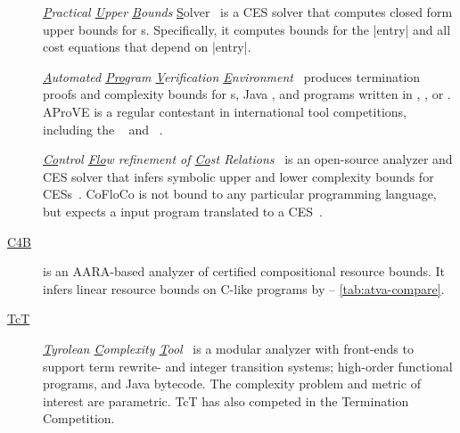 \begin{description}

\item[\href{https://costa.fdi.ucm.es/~costa/pubs/pubs.php}{}]
      \emph{\underline{P}ractical \underline{U}pper \underline{B}ounds}
      \underline{S}olver~\cite{albert2010}
      is a CES solver that computes closed form upper bounds for s. Specifically, it computes bounds for the \pr|entry| and
      all cost equations that depend on \pr|entry|.

\item[\href{https://aprove.informatik.rwth-aachen.de}{}]
      \emph{\underline{A}utomated \underline{Pro}gram \underline{V}erification
      \underline{E}nvironment}~\cite{giesl2016}
      produces termination proofs and complexity bounds for s, Java , and programs written in ,
      , or .
      AProVE is a regular contestant in international tool competitions,
      including the
      \href{https://termination-portal.org/wiki/Termination_Competition}%
      {}~\cite{giesl2019}
      and \href{https://sv-comp.sosy-lab.org}%
      {}~\cite{beyer2022}.

\item[\href{https://github.com/aeflores/CoFloCo}{}]
      \emph{\underline{Co}ntrol \underline{Flo}w refinement of \underline{Co}st
      Relations}~\cite{floresmontoya2014}
      is an open-source analyzer and CES solver that infers symbolic upper and
      lower complexity bounds for CESs~\cite{flores-montoya2016}.
      CoFloCo is not bound to any particular programming language, but expects a
      input program translated to a CES~\cite{flores2016}.

\item[\href{https://github.com/academic-archive/pldi15}{C4B}]\cite{carbonneaux2015}
      is an AARA-based analyzer of certified compositional resource bounds. It
      infers linear resource bounds on C-like programs by  --
      \autoref{tab:atva-compare}.

\item[\href{http://cl-informatik.uibk.ac.at/software/tct/}{TcT}]
       \emph{\underline{T}yrolean \underline{C}omplexity \underline{T}ool}~\cite{avanzini2016}
       is a modular analyzer with front-ends to support term rewrite- and integer transition systems;
       high-order functional programs, and Java bytecode.
       The complexity problem and metric of interest are parametric.
       TcT has also competed in the Termination Competition.


\end{description}
